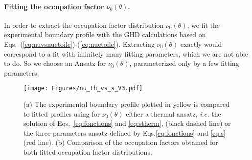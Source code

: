 \paragraph{Fitting the occupation factor $\nu_0(\theta)$.}


In order to extract the occupation factor distribution $\nu_0 (\theta)$, we fit the experimental boundary profile with the GHD calculations based on Eqs.~(\ref{eq:nuvsnuetoile})-(\ref{eq:nuetoile}). Extracting $\nu_0(\theta)$ exactly would correspond to a fit with infinitely many fitting parameters, which we are not able to do. So we choose an Ansatz for $\nu_0(\theta)$, parameterized only by a few fitting parameters.


\begin{figure}[!htb]
    \centering
    \texttt{[image: Figures/nu\_th\_vs\_s\_V3.pdf]}
    \caption{%
    (a) The experimental boundary profile plotted in yellow is compared to fitted profiles using
    for $\nu_0(\theta)$ either  a thermal ansatz, {\it i.e.} the solution of Eqs.~\eqref{eq:fonctions} and  \eqref{eq:stherm}, (black dashed line) or the three-parameters ansatz defined by Eqs.\eqref{eq:fonctions} and \eqref{eq:s} (red line). (b) Comparison of the occupation factors obtained for both fitted 
    occupation factor distributions. 
}
    \label{fig:fitted_border}
\end{figure}


